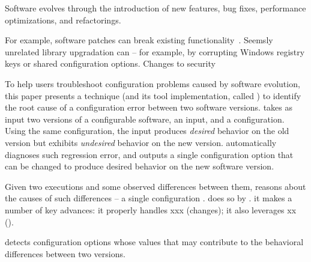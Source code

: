 Software evolves through the introduction of new features, bug fixes,
performance optimizations, and refactorings. 

For example, software
patches can break existing functionality~\cite{}.
Seemsly unrelated library upgradation can
 -- for example, by corrupting Windows
registry keys or shared configuration options.
Changes to security  



To help users troubleshoot configuration problems caused
by software evolution, this paper presents
a technique (and its tool implementation, called
\ourtool) to identify the root cause of a configuration
error between two software versions.  \ourtool takes as input
two versions of a configurable software,
an input, and a configuration. Using the same configuration,
the input produces \textit{desired} behavior
on the old version but exhibits \textit{undesired} behavior on the new version.
\ourtool automatically diagnoses such regression
error, and outputs a single configuration option
that can be changed to produce desired behavior on the
new software version.

 Given two executions and some observed differences between them,
\ourtool reasons about the causes of such differences -- a single configuration
. \ourtool does so by . it makes a number
of key advances: it properly handles xxx (changes); it also leverages
xx ().

 \ourtool detects configuration options whose values
that may contribute to the behavioral differences
between two versions.

